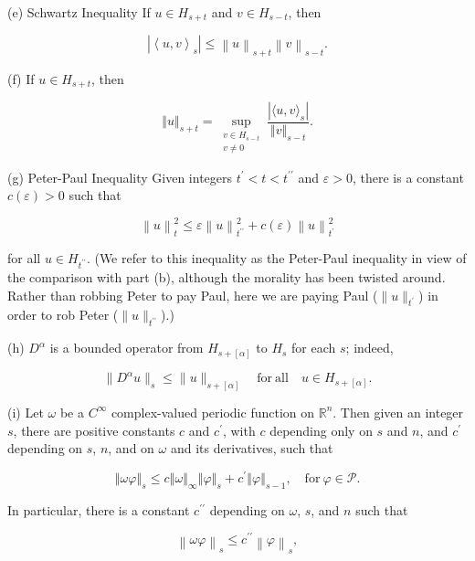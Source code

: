 \begin{theorem}
(e) Schwartz Inequality If  $ u \in H_{s+t} $ and  $ v \in H_{s-t} $, then 

\[
|\left\langle u,v\right\rangle_{s}|\leq\left\|u\right\|_{s+t}\left\|v\right\|_{s-t}.
\]

(f) If  $ u \in H_{s+t} $, then

\[
\left\Vert{u}\right\Vert_{s+t}=\sup_{\substack{v\in H_{s-t}\\ v\neq0}}\frac{|\langle u,v\rangle_{s}|}{\left\Vert{v}\right\Vert_{s-t}}.
\]

(g) Peter-Paul Inequality Given integers $t^{\prime}<t<t^{\prime\prime}$ and $\varepsilon>0$, there is a constant $c(\varepsilon)>0$ such that 

\[
\left\|{u}\right\|_{t}^{2}\leq\varepsilon\left\|{u}\right\|_{t^{\prime\prime}}^{2}+c(\varepsilon)\left\|{u}\right\|_{t^{\prime}}^{2}
\]

for all $u \in H_{t^{\prime\prime}}$. (We refer to this inequality as the Peter-Paul inequality in view of the comparison with part (b), although the morality has been twisted around. Rather than robbing Peter to pay Paul, here we are paying Paul ($\|u\|_{t^{\prime}}$) in order to rob Peter ($\|u\|_{t^{\prime\prime}}$).)

(h)  $ D^{\alpha} $ is a bounded operator from  $ H_{s+[\alpha]} $ to  $ H_{s} $ for each $s$; indeed,

\[
\|D^{\alpha}u\|_{s}\leq\|u\|_{s+[\alpha]}\quad\mathrm{for\ all}\quad u\in H_{s+[\alpha]}.
\]

(i) Let $\omega$ be a $C^{\infty}$ complex-valued periodic function on $\mathbb{R}^{n}$. Then given an integer $s$, there are positive constants $c$ and $c^{\prime}$, with $c$ depending only on $s$ and $n$, and $c^{\prime}$ depending on $s$, $n$, and on $\omega$ and its derivatives, such that

\begin{equation}
\tag{6}\label{eq:6.18:6}
\left\Vert{\omega\varphi}\right\Vert_{s}\leq c\left\Vert{\omega}\right\Vert_{\infty}\left\Vert{\varphi}\right\Vert_{s}+c^{\prime}\left\Vert{\varphi}\right\Vert_{s-1},\quad\mathrm{for}\ \varphi\in\mathcal{P}.
\end{equation}

In particular, there is a constant $c^{\prime \prime}$ depending on $\omega$, $s$, and $n$ such that

\begin{equation}
\tag{7}\label{eq:6.18:7}
\left\lVert{\omega\varphi}\right\rVert_{s}\leq c^{\prime\prime}\left\lVert{\varphi}\right\rVert_{s},
\end{equation}


\end{theorem}
